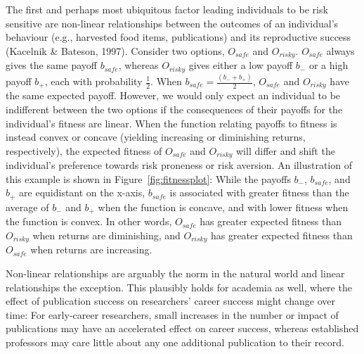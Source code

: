\documentclass[
  ,man,mask,floatsintext]{apa6}
\begin{document}
The first and perhaps most ubiquitous factor leading individuals to be risk sensitive are non-linear relationships between the outcomes of an individual's behaviour (e.g., harvested food items, publications) and its reproductive success (Kacelnik \& Bateson, 1997).
Consider two options, \(O_{safe}\) and \(O_{risky}\).
\(O_{safe}\) always gives the same payoff \(b_{safe}\), whereas \(O_{risky}\) gives either a low payoff \(b_-\) or a high payoff \(b_+\), each with probability \(\frac{1}{2}\).
When \(b_{safe} = \frac{(b_- + b_+)}{2}\), \(O_{safe}\) and \(O_{risky}\) have the same expected payoff.
However, we would only expect an individual to be indifferent between the two options if the consequences of their payoffs for the individual's fitness are linear.
When the function relating payoffs to fitness is instead convex or concave (yielding increasing or diminishing returns, respectively), the expected fitness of \(O_{safe}\) and \(O_{risky}\) will differ and shift the individual's preference towards risk proneness or risk aversion.
An illustration of this example is shown in Figure~\ref{fig:fitnessplot}:
While the payoffs \(b_-\), \(b_{safe}\), and \(b_+\) are equidistant on the x-axis, \(b_{safe}\) is associated with greater fitness than the average of \(b_-\) and \(b_+\) when the function is concave, and with lower fitness when the function is convex.
In other words, \(O_{safe}\) has greater expected fitness than \(O_{risky}\) when returns are diminishing, and \(O_{risky}\) has greater expected fitness than \(O_{safe}\) when returns are increasing.

Non-linear relationships are arguably the norm in the natural world and linear relationships the exception.
This plausibly holds for academia as well, where the effect of publication success on researchers' career success might change over time:
For early-career researchers, small increases in the number or impact of publications may have an accelerated effect on career success, whereas established professors may care little about any one additional publication to their record.
\end{document}

